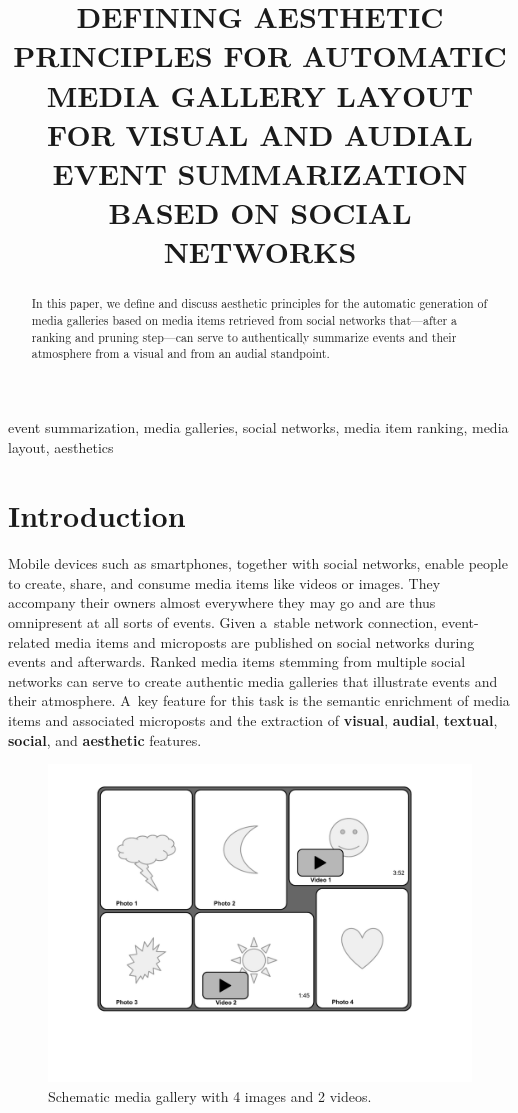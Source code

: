 \documentclass{article}
\title{DEFINING AESTHETIC PRINCIPLES FOR AUTOMATIC MEDIA GALLERY LAYOUT\\
FOR VISUAL AND AUDIAL EVENT SUMMARIZATION BASED ON SOCIAL NETWORKS}
\begin{document}
%
\maketitle
%
\begin{abstract}
In this paper, we define and discuss aesthetic principles
for the automatic generation of media galleries
based on media items retrieved from social networks
that---after a ranking and pruning step---can serve to authentically
summarize events and their atmosphere from a visual
and from an audial standpoint. 
\end{abstract}
%
\begin{keywords}
event summarization, media galleries, social networks,
media item ranking, media layout, aesthetics
\end{keywords}
%
\section{Introduction}
Mobile devices such as smartphones, together with social networks,
enable people to create, share, and consume media items
like videos or images.
They accompany their owners almost everywhere they may go
and are thus omnipresent at all sorts of events.
Given a~stable network connection, event-related media items
and microposts are published on social networks
during events and afterwards.
Ranked media items stemming from multiple social networks
can serve to create authentic media galleries
that illustrate events and their atmosphere.
A~key feature for this task is the semantic enrichment
of media items and associated microposts
and the extraction of \textbf{visual}, \textbf{audial},
\textbf{textual}, \textbf{social}, and \textbf{aesthetic} features.

\begin{figure}[htb]
\centering
\includegraphics[trim=20mm 40mm 20mm 10mm, clip, width=0.75\columnwidth]{media-gallery.pdf}
\caption{Schematic media gallery with 4 images and 2 videos.}
\label{fig:media-gallery}
\end{figure}
\end{document}
